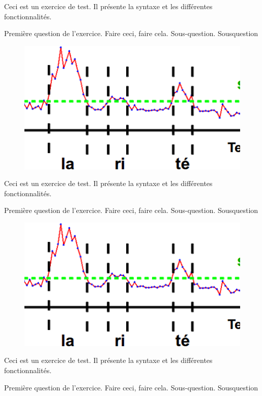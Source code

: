 Ceci est un exercice de test. Il présente la syntaxe et les différentes fonctionnalités.

\question Première question de l'exercice. Faire ceci, faire cela.
\subquestion Sous-question.
\question \subquestion Sousquestion


\begin{figure}
    \centering
    \includegraphics[width=\linewidth]{images/1.png}
\end{figure}

Ceci est un exercice de test. Il présente la syntaxe et les différentes fonctionnalités.

\question Première question de l'exercice. Faire ceci, faire cela.
\subquestion Sous-question.
\question \subquestion Sousquestion


\begin{figure}
    \centering
    \includegraphics[width=\linewidth]{images/1.png}
\end{figure}

Ceci est un exercice de test. Il présente la syntaxe et les différentes fonctionnalités.

\question Première question de l'exercice. Faire ceci, faire cela.
\subquestion Sous-question.
\question \subquestion Sousquestion

